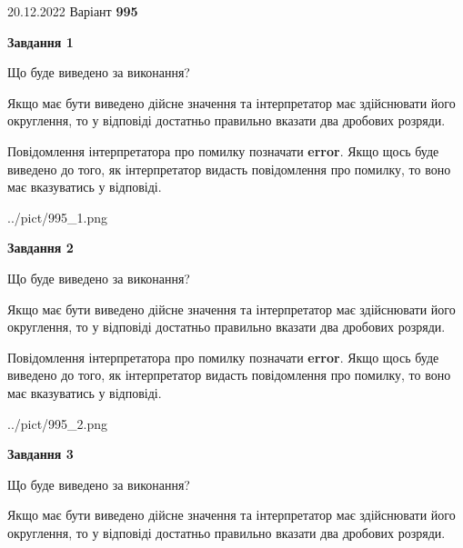 \documentclass[12pt, ukrainian]{article}
\begin{document}
{20.12.2022 Варіант \No \textbf { 995 }\par}
{
\begin {Large}

{\begin {center}\textbf{Завдання 1}\end {center}}\par
Що буде виведено за виконання? \par

Якщо має бути виведено дійсне значення та інтерпретатор має здійснювати його округлення, 
то у відповіді достатньо правильно вказати два дробових розряди.

Повідомлення інтерпретатора про помилку позначати \textbf{error}.
Якщо щось буде виведено до того, як інтерпретатор видасть повідомлення про помилку, 
то воно має вказуватись у відповіді. \par

\begin{center}
	{../pict/995_1.png}
\end{center}
\newpage

{\begin {center}\textbf{Завдання 2}\end {center}}\par
Що буде виведено за виконання? \par

Якщо має бути виведено дійсне значення та інтерпретатор має здійснювати його округлення, 
то у відповіді достатньо правильно вказати два дробових розряди.

Повідомлення інтерпретатора про помилку позначати \textbf{error}.
Якщо щось буде виведено до того, як інтерпретатор видасть повідомлення про помилку, 
то воно має вказуватись у відповіді. \par

\begin{center}
	{../pict/995_2.png}
\end{center}
\newpage

{\begin {center}\textbf{Завдання 3}\end {center}}\par
Що буде виведено за виконання? \par

Якщо має бути виведено дійсне значення та інтерпретатор має здійснювати його округлення, 
то у відповіді достатньо правильно вказати два дробових розряди.


\end{Large}}
\end{document}
